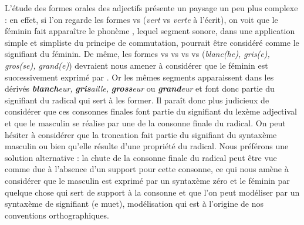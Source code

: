 {    L’étude des formes orales des adjectifs présente un paysage un peu plus complexe : en effet, si l’on regarde les formes  vs  (\textit{vert} vs \textit{verte} à l’écrit), on voit que le féminin fait apparaître le phonème , lequel segment sonore, dans une application simple et simpliste du principe de commutation, pourrait être considéré comme le signifiant du féminin. De même, les formes  vs  vs  vs  vs  (\textit{blanc(he), gris(e), gros(se), grand(e)}) devraient nous amener à considérer que le féminin est successivement exprimé par . Or les mêmes segments apparaissent dans les dérivés \textbf{\textit{blanch}}\textit{eur,} \textbf{\textit{gris}}\textit{aille,} \textbf{\textit{gross}}\textit{eur} ou \textbf{\textit{grand}}\textit{eur} et font donc partie du signifiant du radical qui sert à les former. Il paraît donc plus judicieux de considérer que ces consonnes finales font partie du signifiant du lexème adjectival et que le masculin se réalise par une  de la consonne finale du radical. On peut hésiter à considérer que la troncation fait partie du signifiant du syntaxème masculin ou bien qu’elle résulte d’une propriété du radical. Nous préférons une solution alternative : la chute de la consonne finale du radical peut être vue comme due à l’absence d’un support pour cette consonne, ce qui nous amène à considérer que le masculin est exprimé par un syntaxème zéro et le féminin par quelque chose qui sert de support à la consonne et que l’on peut modéliser par un syntaxème de signifiant   (e muet), modélisation qui est à l’origine de nos conventions orthographiques.



}

